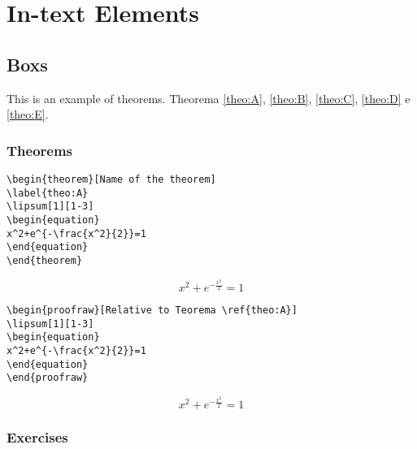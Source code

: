 \chapter{In-text Elements}

\section{Boxs}

This is an example of theorems. Theorema \ref{theo:A}, \ref{theo:B}, \ref{theo:C}, \ref{theo:D} e \ref{theo:E}.

\subsection{Theorems}


\begin{verbatim}
\begin{theorem}[Name of the theorem]
\label{theo:A}
\lipsum[1][1-3]
\begin{equation}
x^2+e^{-\frac{x^2}{2}}=1
\end{equation}
\end{theorem}
\end{verbatim}
\begin{theorem}
\label{theo:A}
\lipsum[1][1-3]
\begin{equation}
x^2+e^{-\frac{x^2}{2}}=1
\end{equation}
\end{theorem}

\begin{verbatim}
\begin{proofraw}[Relative to Teorema \ref{theo:A}]
\lipsum[1][1-3]
\begin{equation}
x^2+e^{-\frac{x^2}{2}}=1
\end{equation}
\end{proofraw}
\end{verbatim}
\begin{proofraw}
\lipsum[1][1-3]
\begin{equation}
x^2+e^{-\frac{x^2}{2}}=1
\end{equation}
\end{proofraw}

\subsection{Exercises}
\lipsum[1][1-3]

